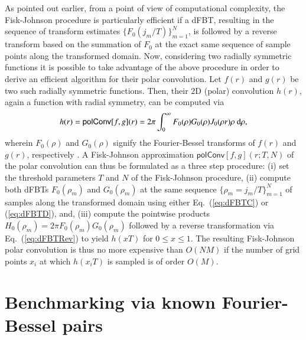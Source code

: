 \documentclass[review]{elsarticle}
\begin{document}
As pointed out earlier, from a point of view of computational complexity, the 
Fisk-Johnson procedure is particularly efficient if a dFBT, resulting
in the sequence of transform estimates $\{F_0(j_m/T)\}_{m=1}^{N}$, is followed 
by a reverse transform based on the summation of $F_0$ at the exact same 
sequence of sample points along the transformed domain. 
Now, considering two radially symmetric functions it is possible to take
advantage of the above procedure in order to derive an efficient algorithm for
their polar convolution. Let $f(r)$ and $g(r)$ be two such radially symmetric
functions. Then, their $2$D (polar) convolution $h(r)$, again a function with
radial symmetry, can be computed via \cite{Baddour:2009} 
\begin{equation}
h(r) = {\mathsf{polConv}}[f,g](r) = 2 \pi \int_{0}^\infty 
F_0(\rho) G_0(\rho) J_0(\rho r)\rho~{\rm{d}}\rho, \label{eq:polConv}
\end{equation}
wherein $F_0(\rho)$ and $G_0(\rho)$ signify the Fourier-Bessel transforms of
$f(r)$ and $g(r)$, respectively \cite{comment:polConv}. A Fisk-Johnson 
approximation ${\mathsf{polConv}}[f,g](r;T,N)$ of the polar convolution can thus be 
formulated as a three step procedure:
(i) set the threshold parameters $T$ and $N$ of the Fisk-Johnson procedure,
(ii) compute both dFBTs $F_0(\rho_m)$ and $G_0(\rho_m)$
at the same sequence $\{\rho_m = j_m/T\}_{m=1}^N$ of samples along the 
transformed domain using either Eq.~(\ref{eq:dFBTC}) or (\ref{eq:dFBTD}), and,
(iii) compute the pointwise products $H_0(\rho_m)=2\pi F_0(\rho_m)G_0(\rho_m)$ 
followed by a reverse transformation via Eq.~(\ref{eq:dFBTRev}) to yield
$h(xT)$ for $0\leq x \leq 1$.
The resulting Fisk-Johnson polar convolution is thus no more expensive than
$O(NM)$ if the number of grid points $x_i$ at which $h(x_iT)$ is sampled  
is of order $O(M)$.

\section{Benchmarking via known Fourier-Bessel pairs}
\label{sec:examples}
\end{document}
